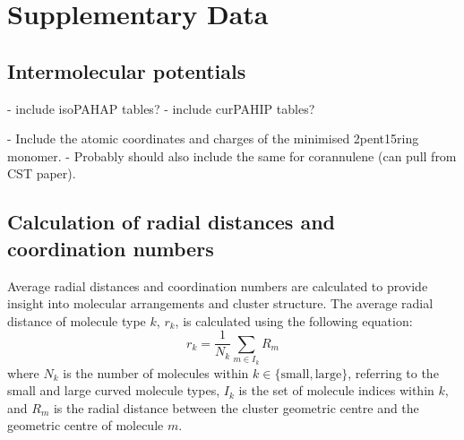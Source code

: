 
\renewcommand{\thefigure}{A\arabic{figure}}
\setcounter{figure}{0}
\renewcommand{\thetable}{A\arabic{table}}
\setcounter{table}{0}

\section{Supplementary Data}
\label{supplinfo}


\subsection{Intermolecular potentials}
- include isoPAHAP tables?
- include curPAHIP tables?

- Include the atomic coordinates and charges of the minimised 2pent15ring monomer.
- Probably should also include the same for corannulene (can pull from CST paper).

\subsection{Calculation of radial distances and coordination numbers}
\label{secSI:raddist_CN_eqns}
%
Average radial distances and coordination numbers are calculated to provide insight into molecular arrangements and cluster structure. The average radial distance of molecule type $k$, $r_{k}$, is calculated using the following equation:
\begin{equation}
    r_{k} = \frac{1}{N_{k}}\sum_{m \in I_{k}}R_{m}
\end{equation}
where $N_{k}$ is the number of molecules within $k \in \{\text{small},\text{large}\}$, referring to the small and large curved molecule types, $I_{k}$ is the set of molecule indices within $k$, and $R_{m}$ is the radial distance between the cluster geometric centre and the geometric centre of molecule $m$.

